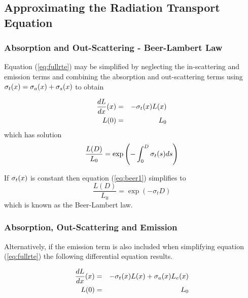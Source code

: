 \subsection{Approximating the Radiation Transport Equation}
\subsubsection{Absorption and Out-Scattering - Beer-Lambert Law}
Equation (\ref{eq:fullrte}) may be simplified by neglecting the
in-scattering and emission terms and combining the absorption and
out-scattering terms using $\sigma_t(x)=\sigma_a(x)+\sigma_s(x)$ to obtain

\begin{eqnarray*}
\frac{dL}{dx}(x)&=&-\sigma_t(x) L(x)\\
L(0)&=&L_0
\end{eqnarray*}
which has solution
\begin{equation}
\label{eq:beer1}
\frac{L(D)}{L_0}=\exp\left({-\int_0^D \sigma_t(s) ds}\right)
\end{equation}

If $\sigma_t(x)$ is constant then equation (\ref{eq:beer1}) simplifies to
\begin{equation}
\label{eq:beer2}
\frac{L(D)}{L_0}=\exp(-\sigma_t D)
\end{equation}
which is known as the Beer-Lambert law\cite{}.


\subsubsection{Absorption, Out-Scattering and Emission}
Alternatively, if the emission term is also included when
simplifying equation (\ref{eq:fullrte})  the following
differential equation results.

\begin{eqnarray}
\label{eq:simple_rte}
\frac{dL}{dx}(x)&=&-\sigma_t(x) L(x) + \sigma_a(x) L_e(x)\\
 L(0)&=&L_0\nonumber
\end{eqnarray}

